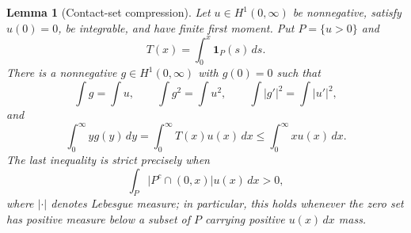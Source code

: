 \documentclass[11pt]{article}
\newtheorem{lemma}[theorem]{Lemma}
\theoremstyle{definition}
\theoremstyle{remark}
\begin{document}
\begin{lemma}[Contact-set compression]\label{lem:compression}
Let $u\in H^1(0,\infty)$ be nonnegative, satisfy $u(0)=0$, be integrable,
and have finite first moment. Put $P=\{u>0\}$ and
\[
 T(x)=\int_0^x\mathbf1_P(s)\,ds.
\]
There is a nonnegative $g\in H^1(0,\infty)$ with $g(0)=0$ such that
\begin{equation}\label{eq:compression-invariants}
 \int g=\int u,
 \qquad \int g^2=\int u^2,
 \qquad \int |g'|^2=\int |u'|^2,
\end{equation}
and
\begin{equation}\label{eq:compression-moment}
 \int_0^\infty yg(y)\,dy
 =\int_0^\infty T(x)u(x)\,dx
 \leq\int_0^\infty xu(x)\,dx.
\end{equation}
The last inequality is strict precisely when
\[
 \int_P\bigl|P^c\cap(0,x)\bigr|u(x)\,dx>0,
\]
where $|\cdot|$ denotes Lebesgue measure; in particular, this holds whenever
the zero set has positive measure below a subset of $P$ carrying positive
$u(x)\,dx$ mass.
\end{lemma}
\end{document}
